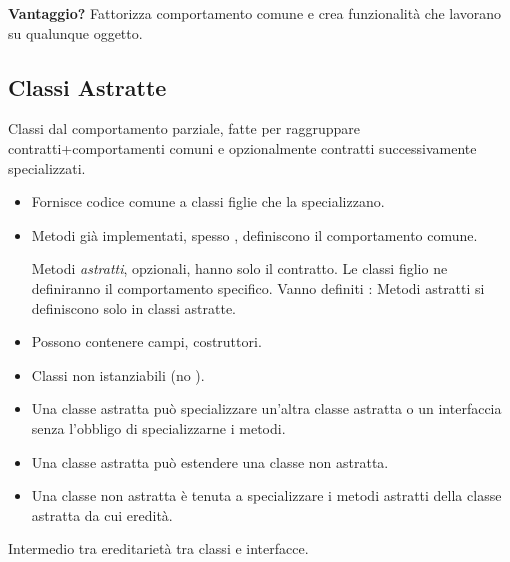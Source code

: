 \textbf{Vantaggio?} Fattorizza comportamento comune e crea funzionalità che lavorano su qualunque oggetto.




\subsection{Classi Astratte}
Classi dal comportamento parziale, fatte per raggruppare contratti+comportamenti comuni e opzionalmente contratti successivamente specializzati.


\begin{itemize}
	\item Fornisce codice comune a classi figlie che la specializzano.
	\item Metodi già implementati, spesso , definiscono il comportamento comune.

	Metodi \textit{astratti}, opzionali, hanno solo il contratto. Le classi figlio ne definiranno il comportamento specifico. Vanno definiti :
	Metodi astratti si definiscono solo in classi astratte.

	\item Possono contenere campi, costruttori.

	\item Classi non istanziabili (no ).
	\item Una classe astratta può specializzare un'altra classe astratta o un interfaccia senza l'obbligo di specializzarne i metodi.
	\item Una classe astratta può estendere una classe non astratta.
	\item Una classe non astratta è tenuta a specializzare i metodi astratti della classe astratta da cui eredità.
\end{itemize}Intermedio tra ereditarietà tra classi e interfacce.

